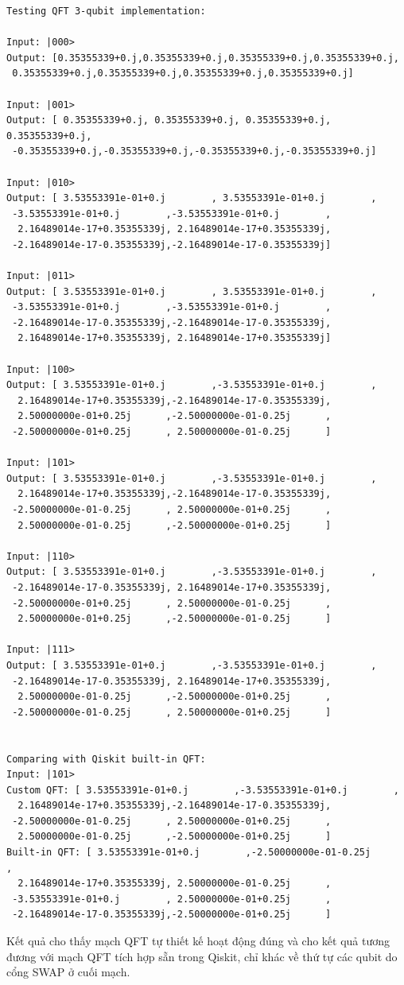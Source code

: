 \begin{lstlisting}
Testing QFT 3-qubit implementation:

Input: |000>
Output: [0.35355339+0.j,0.35355339+0.j,0.35355339+0.j,0.35355339+0.j,
 0.35355339+0.j,0.35355339+0.j,0.35355339+0.j,0.35355339+0.j]

Input: |001>
Output: [ 0.35355339+0.j, 0.35355339+0.j, 0.35355339+0.j, 0.35355339+0.j,
 -0.35355339+0.j,-0.35355339+0.j,-0.35355339+0.j,-0.35355339+0.j]

Input: |010>
Output: [ 3.53553391e-01+0.j        , 3.53553391e-01+0.j        ,
 -3.53553391e-01+0.j        ,-3.53553391e-01+0.j        ,
  2.16489014e-17+0.35355339j, 2.16489014e-17+0.35355339j,
 -2.16489014e-17-0.35355339j,-2.16489014e-17-0.35355339j]

Input: |011>
Output: [ 3.53553391e-01+0.j        , 3.53553391e-01+0.j        ,
 -3.53553391e-01+0.j        ,-3.53553391e-01+0.j        ,
 -2.16489014e-17-0.35355339j,-2.16489014e-17-0.35355339j,
  2.16489014e-17+0.35355339j, 2.16489014e-17+0.35355339j]

Input: |100>
Output: [ 3.53553391e-01+0.j        ,-3.53553391e-01+0.j        ,
  2.16489014e-17+0.35355339j,-2.16489014e-17-0.35355339j,
  2.50000000e-01+0.25j      ,-2.50000000e-01-0.25j      ,
 -2.50000000e-01+0.25j      , 2.50000000e-01-0.25j      ]

Input: |101>
Output: [ 3.53553391e-01+0.j        ,-3.53553391e-01+0.j        ,
  2.16489014e-17+0.35355339j,-2.16489014e-17-0.35355339j,
 -2.50000000e-01-0.25j      , 2.50000000e-01+0.25j      ,
  2.50000000e-01-0.25j      ,-2.50000000e-01+0.25j      ]

Input: |110>
Output: [ 3.53553391e-01+0.j        ,-3.53553391e-01+0.j        ,
 -2.16489014e-17-0.35355339j, 2.16489014e-17+0.35355339j,
 -2.50000000e-01+0.25j      , 2.50000000e-01-0.25j      ,
  2.50000000e-01+0.25j      ,-2.50000000e-01-0.25j      ]

Input: |111>
Output: [ 3.53553391e-01+0.j        ,-3.53553391e-01+0.j        ,
 -2.16489014e-17-0.35355339j, 2.16489014e-17+0.35355339j,
  2.50000000e-01-0.25j      ,-2.50000000e-01+0.25j      ,
 -2.50000000e-01-0.25j      , 2.50000000e-01+0.25j      ]


Comparing with Qiskit built-in QFT:
Input: |101>
Custom QFT: [ 3.53553391e-01+0.j        ,-3.53553391e-01+0.j        ,
  2.16489014e-17+0.35355339j,-2.16489014e-17-0.35355339j,
 -2.50000000e-01-0.25j      , 2.50000000e-01+0.25j      ,
  2.50000000e-01-0.25j      ,-2.50000000e-01+0.25j      ]
Built-in QFT: [ 3.53553391e-01+0.j        ,-2.50000000e-01-0.25j      ,
  2.16489014e-17+0.35355339j, 2.50000000e-01-0.25j      ,
 -3.53553391e-01+0.j        , 2.50000000e-01+0.25j      ,
 -2.16489014e-17-0.35355339j,-2.50000000e-01+0.25j      ]
\end{lstlisting}

Kết quả cho thấy mạch QFT tự thiết kế hoạt động đúng và cho kết quả tương đương với mạch QFT tích hợp sẵn trong Qiskit, chỉ khác về thứ tự các qubit do cổng SWAP ở cuối mạch.
